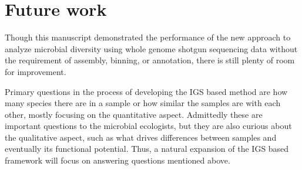 \documentclass{article}
\begin{document}
%
%
%
%
%
%
%
%
%
%
%
%
%
%
%
%
%
%
%
%
%
%

%
%

%
%
%
%
%    

\section{Future work}

Though this manuscript demonstrated the performance of the new approach to 
analyze microbial diversity
using whole genome shotgun sequencing data without the requirement of assembly,
binning, or annotation, there is still plenty of room for improvement.  

Primary questions in the process of developing the IGS based method are how many
species there are in a sample or how similar the samples are with each
other, mostly focusing on the quantitative aspect. Admittedly these are 
important questions to the microbial ecologists, but they are also
curious about the qualitative aspect, such as what drives differences between samples
and eventually its functional potential\cite{Xu2014}.  Thus, a natural 
expansion of the IGS based framework will focus on
answering questions mentioned above. 
\end{document}

